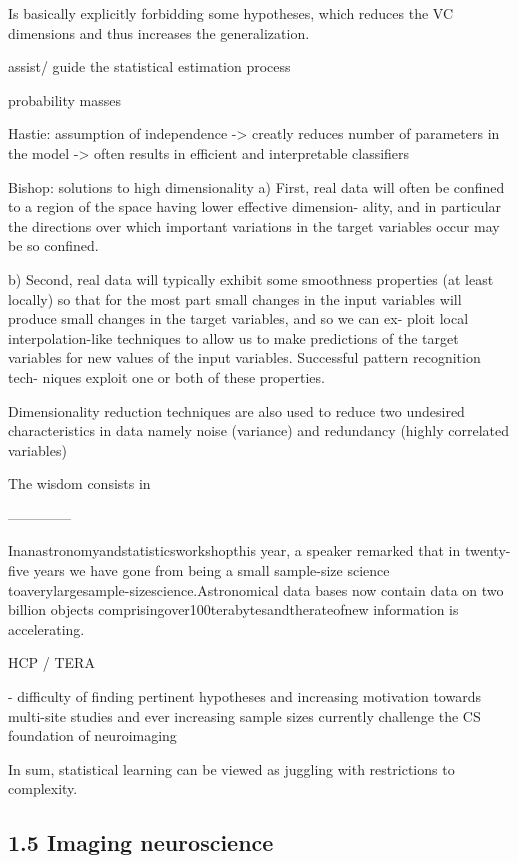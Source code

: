 \documentclass[authoryear,review,3p]{elsarticle}
\begin{document}
Is basically explicitly forbidding some hypotheses, which reduces the VC dimensions and thus increases the generalization.

assist/
guide the statistical estimation process

probability masses


Hastie: assumption of independence -> creatly reduces number of parameters in the model -> often results in efficient and interpretable classifiers


Bishop: solutions to high dimensionality
a) First, real data will often be confined to a region of the space having lower effective dimension- ality, and in particular the directions over which important variations in the target variables occur may be so confined.

b) Second, real data will typically exhibit some smoothness properties (at least locally) so that for the most part small changes in the input variables will produce small changes in the target variables, and so we can ex- ploit local interpolation-like techniques to allow us to make predictions of the target variables for new values of the input variables. Successful pattern recognition tech- niques exploit one or both of these properties. 

Dimensionality reduction techniques are also used to reduce two undesired characteristics in data namely noise (variance) and redundancy (highly correlated variables)




The wisdom consists in


--------------

Inanastronomyandstatisticsworkshopthis year, a speaker remarked that in twenty-five years we have gone from being a small sample-size science toaverylargesample-sizescience.Astronomical data bases now contain data on two billion objects comprisingover100terabytesandtherateofnew information is accelerating.

HCP / TERA


- difficulty of finding pertinent hypotheses and increasing motivation towards multi-site studies and ever increasing sample sizes currently challenge the CS foundation of neuroimaging


In sum,
statistical learning can be viewed as juggling with
restrictions to complexity.



\subsection*{1.5 Imaging neuroscience}
\end{document}
